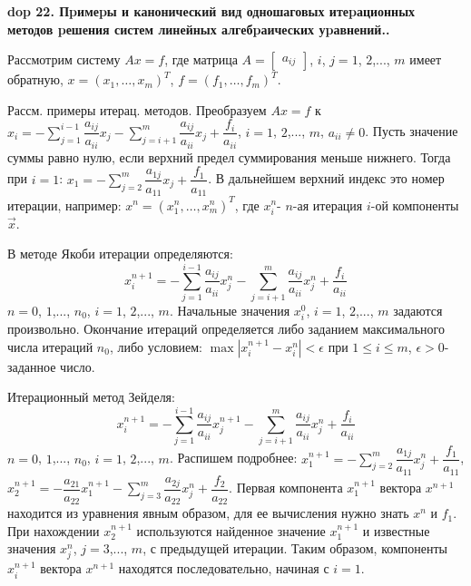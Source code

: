 \textbf{\LARGE dop 22. Пpимеpы и канонический вид одношаговых итеpационных методов pешения систем линейных алгебpаических уpавнений..}


\par Рассмотрим систему $Ax=f$, где матрица $A=\begin{bmatrix}a_{ij}\end{bmatrix}$, $i$, $j=1$, $2$,..., $m$ имеет обратную, $x=\left( x_{1},\ldots ,x_{m}\right) ^{T}$, $f=\left( f_{1},\ldots ,f_{m}\right) ^{T}$.
\par Рассм. примеры итерац. методов. Преобразуем $Ax=f$ к $x_{i}=-\sum ^{i-1}_{j=1}\dfrac{a_{ij}}{a_{ii}}x_{j}-\sum ^{m}_{j=i+1}\dfrac{a_{ij}}{a_{ii}}x_{j}+\dfrac{f_{i}}{a_{ii}}$, $i=1$, $2$,..., $m$, $a_{ii}\neq 0$. Пусть значение суммы равно нулю, если верхний предел суммирования меньше нижнего. Тогда при $i=1$: $x_{1}=-\sum ^{m}_{j=2}\dfrac{a_{1j}}{a_{11}}x_{j}+\dfrac{f_{1}}{a_{11}}$. В дальнейшем верхний индекс это номер итерации, например: $x^{n}=\left( x_{1}^{n},\ldots ,x_{m}^{n}\right) ^{T}$, где $x_{i}^{n}$- $n$-ая итерация $i$-ой компоненты $\overrightarrow{x}$.
\par В методе Якоби итерации определяются:
\begin{equation*}
   x_{i}^{n+1}=-\sum ^{i-1}_{j=1}\dfrac{a_{ij}}{a_{ii}}x_{j}^{n}-\sum ^{m}_{j=i+1}\dfrac{a_{ij}}{a_{ii}}x_{j}^{n}+\dfrac{f_{i}}{a_{ii}} 
\end{equation*}
$n=0$, $1$,..., $n_{0}$, $i=1$, $2$,..., $m$. Начальные значения $x_{i}^{0}$, $i=1$, $2$,..., $m$ задаются произвольно. Окончание итераций определяется либо заданием максимального числа итераций $n_{0}$, либо условием: $\max \left| x_{i}^{n+1}-x_{i}^{n}\right| <\epsilon$ при $1\leq i\leq m$, $\epsilon>0$- заданное число.
\par Итерационный метод Зейделя: 
\begin{equation*}
    x_{i}^{n+1}=-\sum ^{i-1}_{j=1}\dfrac{a_{ij}}{a_{ii}}x_{j}^{n+1}-\sum ^{m}_{j=i+1}\dfrac{a_{ij}}{a_{ii}}x_{j}^{n}+\dfrac{f_{i}}{a_{ii}}
\end{equation*}
$n=0$, $1$,..., $n_{0}$, $i=1$, $2$,..., $m$. Распишем подробнее: $x_{1}^{n+1}=-\sum ^{m}_{j=2}\dfrac{a_{1j}}{a_{11}}x_{j}^{n}+\dfrac{f_{1}}{a_{11}}$, $x_{2}^{n+1}=-\dfrac{a_{21}}{a_{22}}x_{1}^{n+1}-\sum ^{m}_{j=3}\dfrac{a_{2j}}{a_{22}}x_{j}^{n}+\dfrac{f_{2}}{a_{22}}$. Первая компонента $x_{1}^{n+1}$ вектора $x^{n+1}$ находится из уравнения явным образом, для ее вычисления нужно знать $x^{n}$ и $f_1$. При нахождении $x_{2}^{n+1}$ используются найденное значение $x_{1}^{n+1}$ и известные значения $x_{j}^{n}$, $j=3$,..., $m$, с предыдущей итерации. Таким образом, компоненты $x_{i}^{n+1}$ вектора $x^{n+1}$ находятся последовательно, начиная с $i=1$.

